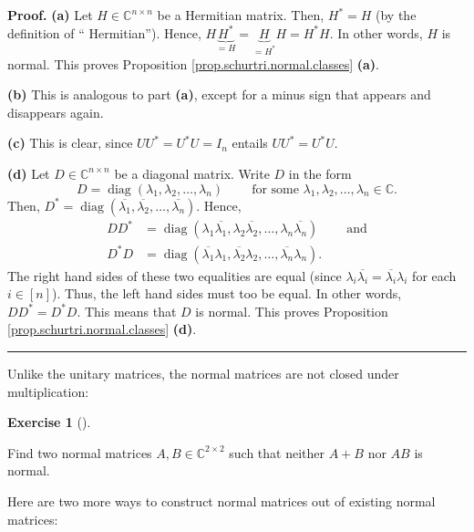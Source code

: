\documentclass[numbers=enddot,12pt,final,onecolumn,notitlepage]{scrartcl}%
\newcounter{exer}
\numberwithin{exer}{subsection}
\theoremstyle{definition}
\newtheorem{exmp}[exer]{Exercise}
\newenvironment{exercise}[1][]
{\begin{exmp}[#1]\begin{leftbar}}
{\end{leftbar}\end{exmp}}
\newenvironment{proof}[1][Proof]{\noindent\textbf{#1.} }{\ \rule{0.5em}{0.5em}}
\begin{document}
\begin{proof}
\textbf{(a)} Let $H\in\mathbb{C}^{n\times n}$ be a Hermitian matrix. Then,
$H^{\ast}=H$ (by the definition of \textquotedblleft
Hermitian\textquotedblright). Hence, $H\underbrace{H^{\ast}}_{=H}%
=\underbrace{H}_{=H^{\ast}}H=H^{\ast}H$. In other words, $H$ is normal. This
proves Proposition \ref{prop.schurtri.normal.classes} \textbf{(a)}. \medskip

\textbf{(b)} This is analogous to part \textbf{(a)}, except for a minus sign
that appears and disappears again. \medskip

\textbf{(c)} This is clear, since $UU^{\ast}=U^{\ast}U=I_{n}$ entails
$UU^{\ast}=U^{\ast}U$. \medskip

\textbf{(d)} Let $D\in\mathbb{C}^{n\times n}$ be a diagonal matrix. Write $D$
in the form
\[
D=\operatorname*{diag}\left(  \lambda_{1},\lambda_{2},\ldots,\lambda
_{n}\right)  \ \ \ \ \ \ \ \ \ \ \text{for some }\lambda_{1},\lambda
_{2},\ldots,\lambda_{n}\in\mathbb{C}.
\]
Then, $D^{\ast}=\operatorname*{diag}\left(  \overline{\lambda_{1}}%
,\overline{\lambda_{2}},\ldots,\overline{\lambda_{n}}\right)  $. Hence,
\begin{align*}
DD^{\ast} &  =\operatorname*{diag}\left(  \lambda_{1}\overline{\lambda_{1}%
},\lambda_{2}\overline{\lambda_{2}},\ldots,\lambda_{n}\overline{\lambda_{n}%
}\right)  \ \ \ \ \ \ \ \ \ \ \text{and}\\
D^{\ast}D &  =\operatorname*{diag}\left(  \overline{\lambda_{1}}\lambda
_{1},\overline{\lambda_{2}}\lambda_{2},\ldots,\overline{\lambda_{n}}%
\lambda_{n}\right)  .
\end{align*}
The right hand sides of these two equalities are equal (since $\lambda
_{i}\overline{\lambda_{i}}=\overline{\lambda_{i}}\lambda_{i}$ for each
$i\in\left[  n\right]  $). Thus, the left hand sides must too be equal. In
other words, $DD^{\ast}=D^{\ast}D$. This means that $D$ is normal. This proves
Proposition \ref{prop.schurtri.normal.classes} \textbf{(d)}.
\end{proof}

Unlike the unitary matrices, the normal matrices are not closed under multiplication:

\begin{exercise}
\label{exe.schurtri.normal.not-additive} Find two normal matrices
$A,B\in\mathbb{C}^{2\times2}$ such that neither $A+B$ nor $AB$ is normal.
\end{exercise}

Here are two more ways to construct normal matrices out of existing normal matrices:
\end{document}
